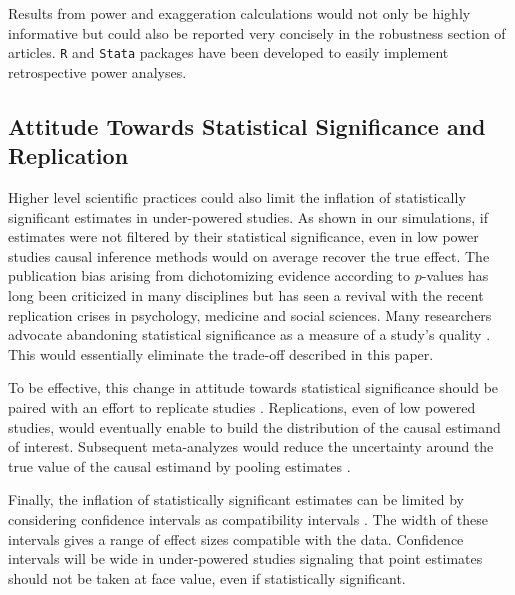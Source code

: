 \documentclass[12pt]{article}
\begin{document}
    Results from power and exaggeration calculations would not only be highly informative but could also be reported very concisely in the robustness section of articles. \texttt{R} and \texttt{Stata} packages have been developed \citep{timm_retrodesign_2019, linden_retrodesign_2019} to easily implement retrospective power analyses. 

\subsection{Attitude Towards Statistical Significance and Replication}

    Higher level scientific practices could also limit the inflation of statistically significant estimates in under-powered studies. As shown in our simulations, if estimates were not filtered by their statistical significance, even in low power studies causal inference methods would on average recover the true effect. The publication bias arising from dichotomizing evidence according to $p$-values has long been criticized in many disciplines but has seen a revival with the recent replication crises in psychology, medicine and social sciences. Many researchers advocate abandoning statistical significance as a measure of a study's quality \citep{mcshane_abandon_2019}. This would essentially eliminate the trade-off described in this paper.

    To be effective, this change in attitude towards statistical significance should be paired with an effort to replicate studies \citep{christensen_transparency_2018}. Replications, even of low powered studies, would eventually enable to build the distribution of the causal estimand of interest. Subsequent meta-analyzes would reduce the uncertainty around the true value of the causal estimand by pooling estimates \citep{hernan_causal_2021}. 

    Finally, the inflation of statistically significant estimates can be limited by considering confidence intervals as compatibility intervals \citep{shadish_experimental_2002, amrhein_inferential_2019, romer_praise_2020}. The width of these intervals gives a range of effect sizes compatible with the data. Confidence intervals will be wide in under-powered studies signaling that point estimates should not be taken at face value, even if statistically significant.


\end{document}
